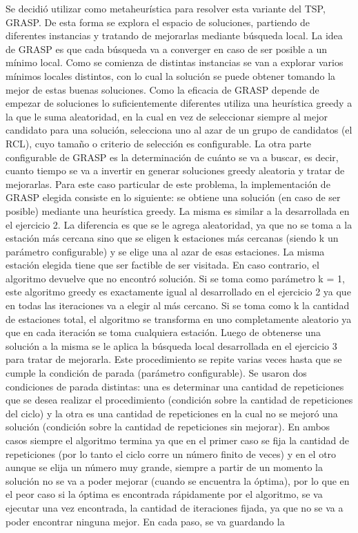         Se decidió utilizar como metaheurística para resolver esta variante del TSP, GRASP. De esta forma se explora el espacio de soluciones, partiendo de diferentes instancias y tratando de mejorarlas mediante búsqueda local. La idea de GRASP es que cada búsqueda va a converger en caso de ser posible a un mínimo local. Como se comienza de distintas instancias se van a explorar varios mínimos locales distintos, con lo cual la solución se puede obtener tomando la mejor de estas buenas soluciones. Como la eficacia de GRASP depende de empezar de soluciones lo suficientemente diferentes utiliza una heurística greedy a la que le suma aleatoridad, en la cual en vez de seleccionar siempre al mejor candidato para una solución, selecciona uno al azar de un grupo de candidatos (el RCL), cuyo tamaño o criterio de selección es configurable. La otra parte configurable de GRASP es la determinación de cuánto se va a buscar, es decir, cuanto tiempo se va a invertir en generar soluciones greedy aleatoria y tratar de mejorarlas. Para este caso particular de este problema, la implementación de GRASP elegida consiste en lo siguiente: se obtiene una solución (en caso de ser posible) mediante una heurística greedy. La misma es similar a la desarrollada en el ejercicio 2. La diferencia es que se le agrega aleatoridad, ya que no se toma a la estación más cercana sino que se eligen k estaciones más cercanas (siendo k un parámetro configurable) y se elige una al azar de esas estaciones. La misma estación elegida tiene que ser factible de ser visitada. En caso contrario, el algoritmo devuelve que no encontró solución. Si se toma como parámetro k = 1, este algoritmo greedy es exactamente igual al desarrollado en el ejercicio 2 ya que en todas las iteraciones va a elegir al más cercano. Si se toma como k la cantidad de estaciones total, el algoritmo se transforma en uno completamente aleatorio ya que en cada iteración se toma cualquiera estación. Luego de obtenerse una solución a la misma se le aplica la búsqueda local desarrollada en el ejercicio 3 para tratar de mejorarla. Este procedimiento se repite varias veces hasta que se cumple la condición de parada (parámetro configurable). Se usaron dos condiciones de parada distintas: una es determinar una cantidad de repeticiones que se desea realizar el procedimiento (condición sobre la cantidad de repeticiones del ciclo) y la otra es una cantidad de repeticiones en la cual no se mejoró una solución (condición sobre la cantidad de repeticiones sin mejorar). En ambos casos siempre el algoritmo termina ya que en el primer caso se fija la cantidad de repeticiones (por lo tanto el ciclo corre un número finito de veces) y en el otro aunque se elija un número muy grande, siempre a partir de un momento la solución no se va a poder mejorar (cuando se encuentra la óptima), por lo que en el peor caso si la óptima es encontrada rápidamente por el algoritmo, se va ejecutar una vez encontrada, la cantidad de iteraciones fijada, ya que no se va a poder encontrar ninguna mejor. En cada paso, se va guardando la 